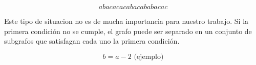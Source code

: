 \begin{equation}
a b a c a c a c a b a c a b a b a c a c
\end{equation}

Este tipo de situacion no es de mucha importancia para nuestro trabajo.
Si la primera condici\'{o}n no se cumple, el grafo puede ser separado en
un conjunto de subgrafos que satisfagan cada uno la primera condici\'{o}n.

\begin{equation}
b = a - 2 \text{ (ejemplo)}
\end{equation}
